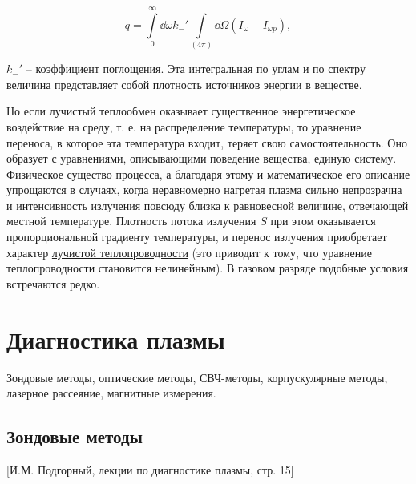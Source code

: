 \documentclass[10pt, a4paper]{article}
\let\stdsection\section
\renewcommand\section{\newpage\stdsection}
\begin{document}
\begin{equation*}
	q = \int\limits_0^\infty\dd{\omega}k_{-}'\int\limits_{(4\pi)}\dd{\Omega}(I_\omega-I_{\omega p}),
\end{equation*}

$k_{-}'$ -- коэффициент поглощения. Эта интегральная по углам и по спектру величина представляет собой плотность источников энергии в веществе.

Но если лучистый теплообмен оказывает существенное энергетическое воздействие на среду, т. е. на распределение температуры, то уравнение переноса, в которое эта температура входит, теряет свою самостоятельность. Оно образует с уравнениями, описывающими поведение вещества, единую систему. Физическое существо процесса, а благодаря этому и математическое его описание упрощаются в случаях, когда неравномерно нагретая плазма сильно непрозрачна и интенсивность излучения повсюду близка к равновесной величине, отвечающей местной температуре. Плотность потока излучения $S$ при этом оказывается пропорциональной градиенту температуры, и перенос излучения приобретает характер \uline{лучистой теплопроводности} (это приводит к тому, что уравнение теплопроводности становится нелинейным). В газовом разряде подобные условия встречаются редко. 

\section{Диагностика плазмы} 

Зондовые методы, оптические методы, СВЧ-методы, корпускулярные методы, лазерное рассеяние, магнитные измерения.

\subsection{Зондовые методы}

[И.М. Подгорный, лекции по диагностике плазмы, стр. 15]
\end{document}
